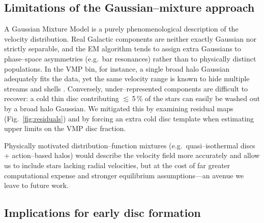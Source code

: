 \documentclass[a4paper,12pt]{article}
\begin{document}
\subsection{Limitations of the Gaussian–mixture approach}
\label{subsec:gmm_limits}

A Gaussian Mixture Model is a purely phenomenological description of
the velocity distribution.  Real Galactic components are neither
exactly Gaussian nor strictly separable, and the EM algorithm tends to
assign extra Gaussians to phase–space asymmetries (e.g.\ bar
resonances) rather than to physically distinct populations.  
In the VMP bin, for instance, a single broad halo Gaussian
adequately fits the data, yet the same velocity range is known to hide
multiple streams and shells \citep[e.g.][]{Koppelman2018}.  
Conversely, under–represented components are difficult to recover: a
cold thin disc contributing $\lesssim$\,5\,\% of the stars can easily
be washed out by a broad halo Gaussian.  We mitigated this by
examining residual maps (Fig.~\ref{fig:residuals}) and by forcing an
extra cold disc template when estimating upper limits on the VMP disc
fraction.

Physically motivated distribution–function mixtures
(e.g.\ quasi–isothermal discs + action–based halos) would describe the
velocity field more accurately and allow us to include stars lacking
radial velocities, but at the cost of far greater computational
expense and stronger equilibrium assumptions—an avenue we leave to
future work.

\subsection{Implications for early disc formation}
\label{subsec:implications}
\end{document}
